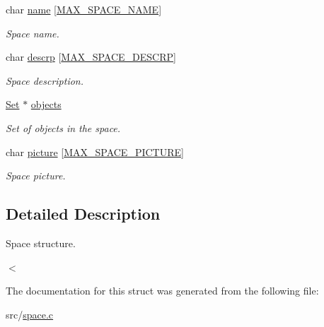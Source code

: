 \begin{DoxyCompactItemize}
\mbox{\label{struct__Space_ad69773f9a031624255530244436a211f}} 
char \hyperlink{struct__Space_ad69773f9a031624255530244436a211f}{name} \mbox{[}\hyperlink{space_8h_a95d9e86d5e1a02663f74b6896e5975c6}{M\+A\+X\+\_\+\+S\+P\+A\+C\+E\+\_\+\+N\+A\+ME}\mbox{]}
\begin{DoxyCompactList}\small\item\em Space name. \end{DoxyCompactList}\item 
\mbox{\label{struct__Space_a477314d861f3e27b4dee8087a4f9ec3e}} 
char \hyperlink{struct__Space_a477314d861f3e27b4dee8087a4f9ec3e}{descrp} \mbox{[}\hyperlink{space_8h_aed836b26b3a8e93a4d652bbe81bf66d5}{M\+A\+X\+\_\+\+S\+P\+A\+C\+E\+\_\+\+D\+E\+S\+C\+RP}\mbox{]}
\begin{DoxyCompactList}\small\item\em Space description. \end{DoxyCompactList}\item 
\mbox{\label{struct__Space_a661ed8b0fc8085b6db70188aa5085625}} 
\hyperlink{set_8h_a6d3b7f7c92cbb4577ef3ef7ddbf93161}{Set} $\ast$ \hyperlink{struct__Space_a661ed8b0fc8085b6db70188aa5085625}{objects}
\begin{DoxyCompactList}\small\item\em Set of objects in the space. \end{DoxyCompactList}\item 
\mbox{\label{struct__Space_adfb0c2325d408d79fd790d7c3ca3228e}} 
char \hyperlink{struct__Space_adfb0c2325d408d79fd790d7c3ca3228e}{picture} \mbox{[}\hyperlink{space_8h_a81ff4df6e3833e5b8f8bd6255f4e3df6}{M\+A\+X\+\_\+\+S\+P\+A\+C\+E\+\_\+\+P\+I\+C\+T\+U\+RE}\mbox{]}
\begin{DoxyCompactList}\small\item\em Space picture. \end{DoxyCompactList}\end{DoxyCompactItemize}


\subsection{Detailed Description}
Space structure. 

$<$ 

The documentation for this struct was generated from the following file\+:\begin{DoxyCompactItemize}
\item 
src/\hyperlink{space_8c}{space.\+c}\end{DoxyCompactItemize}
